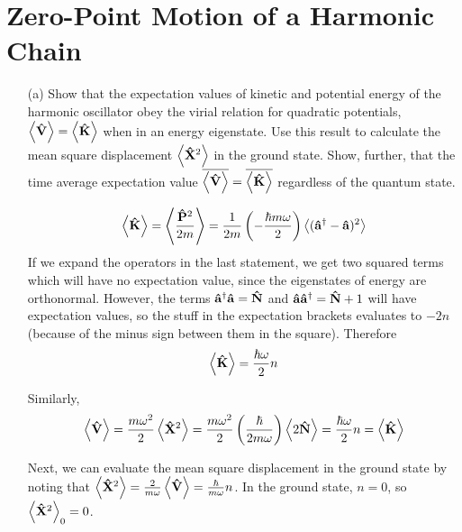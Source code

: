 \documentclass[a4paper,twoside]{article}
\begin{document}
\section*{Zero-Point Motion of a Harmonic Chain}
\begin{itemize}
    \item[(a)] Show that the expectation values of kinetic and potential energy of the harmonic oscillator obey the virial relation for quadratic potentials, $ \ev{ \vu{V}} = \ev{ \vu{K}} $ when in an energy eigenstate. Use this result to calculate the mean square displacement $ \ev{ \vu{X}^2} $ in the ground state. Show, further, that the time average expectation value $ \overline{\ev{ \vu{V}}} = \overline{\ev{ \vu{K}}} $ regardless of the quantum state.
        \begin{problem}
            \begin{equation}
                \ev{ \vu{K}} = \ev{\frac{ \vu{P}^2}{2m}} = \frac{1}{2m} \left( - \frac{\hbar m \omega}{2} \right) \ev{( \vu{a}^\dagger - \vu{a} )^2}
            \end{equation}
            If we expand the operators in the last statement, we get two squared terms which will have no expectation value, since the eigenstates of energy are orthonormal. However, the terms $ \vu{a}^\dagger \vu{a} = \vu{N} $ and $ \vu{a} \vu{a}^\dagger = \vu{N} + 1 $ will have expectation values, so the stuff in the expectation brackets evaluates to $ - 2n $ (because of the minus sign between them in the square). Therefore
            \begin{equation}
                \ev{ \vu{K}} = \frac{\hbar \omega}{2} n
            \end{equation}

            Similarly,
            \begin{equation}
                \ev{ \vu{V}} = \frac{m \omega^2}{2} \ev{ \vu{X}^2} = \frac{m \omega^2}{2} \left( \frac{\hbar}{2 m \omega} \right) \ev{2 \vu{N}} = \frac{\hbar \omega}{2} n = \ev{ \vu{K}}
            \end{equation}

            Next, we can evaluate the mean square displacement in the ground state by noting that $ \ev{ \vu{X}^2} = \frac{2}{m \omega} \ev{ \vu{V}} = \frac{\hbar}{m \omega} n $. In the ground state, $ n = 0 $, so $ \ev{ \vu{X}^2}_{0} = 0 $.


\end{problem}
\end{itemize}
\end{document}
